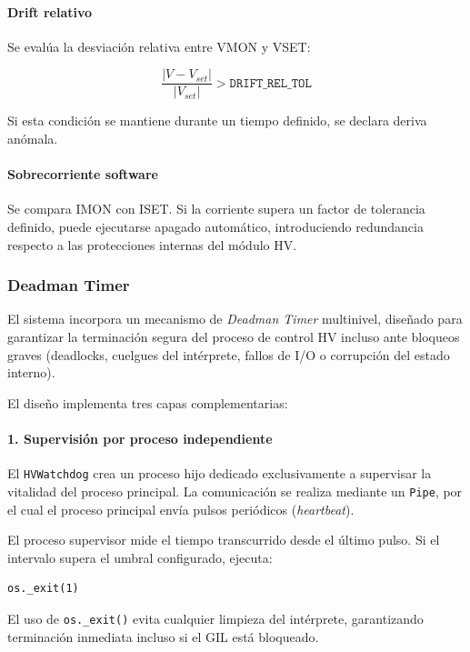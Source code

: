 \documentclass{article}
\begin{document}
\paragraph{Drift relativo}

Se evalúa la desviación relativa entre VMON y VSET:

\[
\frac{|V - V_{set}|}{|V_{set}|} > \texttt{DRIFT\_REL\_TOL}
\]

Si esta condición se mantiene durante un tiempo definido, se declara
deriva anómala.

\paragraph{Sobrecorriente software}

Se compara IMON con ISET. Si la corriente supera un factor de tolerancia
definido, puede ejecutarse apagado automático, introduciendo redundancia
respecto a las protecciones internas del módulo HV.

\subsubsection{Deadman Timer}

El sistema incorpora un mecanismo de \emph{Deadman Timer} multinivel,
diseñado para garantizar la terminación segura del proceso de control HV
incluso ante bloqueos graves (deadlocks, cuelgues del intérprete,
fallos de I/O o corrupción del estado interno).

El diseño implementa tres capas complementarias:

\paragraph{1. Supervisión por proceso independiente}

El \texttt{HVWatchdog} crea un proceso hijo dedicado exclusivamente a
supervisar la vitalidad del proceso principal. La comunicación se realiza
mediante un \texttt{Pipe}, por el cual el proceso principal envía pulsos
periódicos (\emph{heartbeat}).

El proceso supervisor mide el tiempo transcurrido desde el último pulso.
Si el intervalo supera el umbral configurado, ejecuta:

\begin{verbatim}
os._exit(1)
\end{verbatim}

El uso de \texttt{os.\_exit()} evita cualquier limpieza del intérprete,
garantizando terminación inmediata incluso si el GIL está bloqueado.
\end{document}

